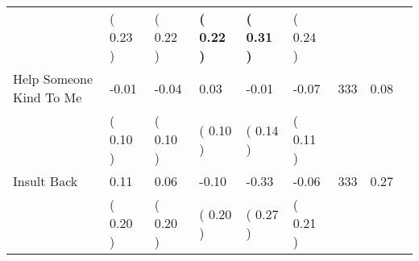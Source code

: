 \begin{tabular}{L{6.2cm} C{1.8cm} C{1.8cm} C{1.8cm} C{1.8cm} C{1.8cm} C{1.8cm} C{0.3cm} C{0.3cm}}
 & (     0.23 ) & (     0.22 ) & \textbf{(     0.22 )} & \textbf{(     0.31 )} & (     0.24 )  & \\
Help Someone Kind To Me &     -0.01 &     -0.04 &      0.03 &     -0.01 &     -0.07  & 333 &       0.08 \\ 
 & (     0.10 ) & (     0.10 ) & (     0.10 ) & (     0.14 ) & (     0.11 )  & \\
Insult Back &      0.11 &      0.06 &     -0.10 &     -0.33 &     -0.06  & 333 &       0.27 \\ 
 & (     0.20 ) & (     0.20 ) & (     0.20 ) & (     0.27 ) & (     0.21 )  & \\
\bottomrule
\end{tabular}
